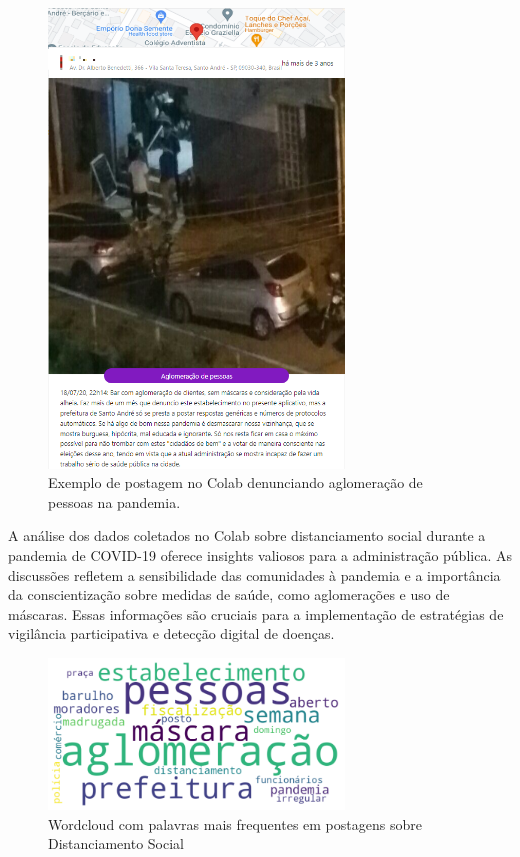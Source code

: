 \begin{figure}[htb]
	\centering
	\includegraphics[width=0.7\textwidth]{images/colab_posts_social_distancing.png}
	\caption{Exemplo de postagem no Colab denunciando aglomeração de pessoas na pandemia.}
	\label{fig:colab_posts_social_distancing}
\end{figure}

A análise dos dados coletados no Colab sobre distanciamento social durante a pandemia de COVID-19 oferece insights valiosos para a administração pública. As discussões refletem a sensibilidade das comunidades à pandemia e a importância da conscientização sobre medidas de saúde, como aglomerações e uso de máscaras. Essas informações são cruciais para a implementação de estratégias de vigilância participativa e detecção digital de doenças.

\begin{figure}[htb]
	\centering
	\includegraphics[width=0.7\textwidth]{images/wordcloud_social_distancing.png}
	\caption{Wordcloud com palavras mais frequentes em postagens sobre Distanciamento Social}
	\label{fig:wordcloud_social_distancing}
\end{figure}

